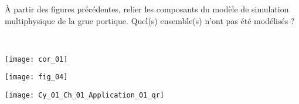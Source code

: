 \fi

\begin{question}
À partir des figures précédentes, relier les composants du modèle de simulation
multiphysique de la grue portique. Quel(s) ensemble(s) n’ont pas été modélisés ?
\end{question}

\ifprof
\begin{corrige}~\\

\begin{center}
\texttt{[image: cor\_01]}
\end{center}
\end{corrige}
\else
\fi


\ifprof
\else
\begin{center}
\texttt{[image: fig\_04]}
\end{center}
\fi

\ifprof
\else
\begin{marginfigure}
\centering
\texttt{[image: Cy\_01\_Ch\_01\_Application\_01\_qr]}
\end{marginfigure}
\fi
